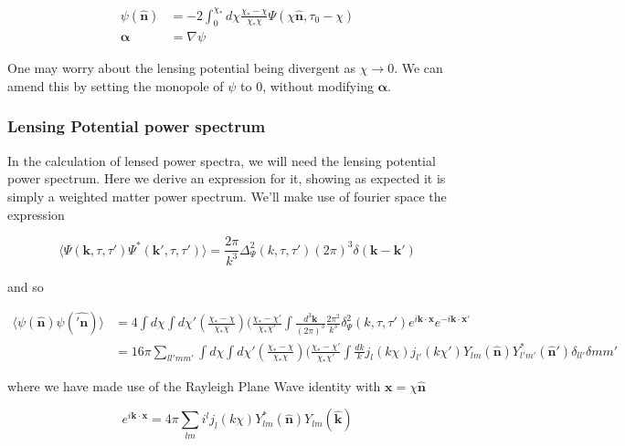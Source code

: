 \documentclass[a4paper,10pt]{article}
\renewcommand{\v}[1]{\mathbf{#1}}
\newcommand{\fint}[1]{\int \frac{d^3 \v{#1}}{(2\pi)^3}}
\newcommand{\unit}[1]{\hat{\v{#1}}}
\begin{document}
\begin{equation}\begin{split}
\psi(\unit{n}) &= -2 \int_0^{\chi_*}d\chi \frac{\chi_*-\chi}{\chi_*\chi}\Psi(\chi\unit{n},\tau_0-\chi)\\
\v{\alpha} &= \nabla \psi
\end{split}\end{equation}

One may worry about the lensing potential being divergent as $\chi \rightarrow 0$. We can amend this by setting the monopole of $\psi$ to 0, without modifying $\v{\alpha}$. 

\subsubsection{Lensing Potential power spectrum}

In the calculation of lensed power spectra, we will need the lensing potential power spectrum. Here we derive an expression for it, showing as expected it is simply a weighted matter power spectrum. We'll make use of fourier space the expression

\begin{equation}
\langle \Psi(\v{k},\tau,\tau')\Psi^*(\v{k}',\tau,\tau')\rangle=\frac{2\pi}{k^3}\Delta^2_\Psi(k,\tau,\tau')(2\pi)^3\delta(\v{k}-\v{k}')
\end{equation}

and so 

\begin{equation}\begin{split}
\langle \psi(\unit{n})\psi(\unit{'n}) \rangle &= 4\int d\chi \int d\chi'(\frac{\chi_*-\chi}{\chi_*\chi})(\frac{\chi_*-\chi'}{\chi_*\chi'}\fint{k}\frac{2\pi^2}{k^3}\delta^2_\Psi(k,\tau,\tau')e^{i\v{k}\cdot\v{x}}e^{-i\v{k}\cdot\v{x'}}\\
&= 16\pi \sum_{ll'mm'}\int d\chi \int d\chi'(\frac{\chi_*-\chi}{\chi_*\chi})(\frac{\chi_*-\chi'}{\chi_*\chi'}\int \frac{dk}{k}j_l(k\chi)j_{l'}(k\chi')Y_{lm}(\unit{n})Y^*_{l'm'}(\unit{n}')\delta_{ll'}\delta{mm'}
\end{split}\end{equation}

where we have made use of the Rayleigh Plane Wave identity with $\v{x}=\chi\unit{n}$

\begin{equation}
e^{i\v{k}\cdot\v{x}} = 4\pi\sum_{lm}i^lj_l(k\chi)Y_{lm}^*(\unit{n})Y_{lm}(\unit{k})
\end{equation}
\end{document}
